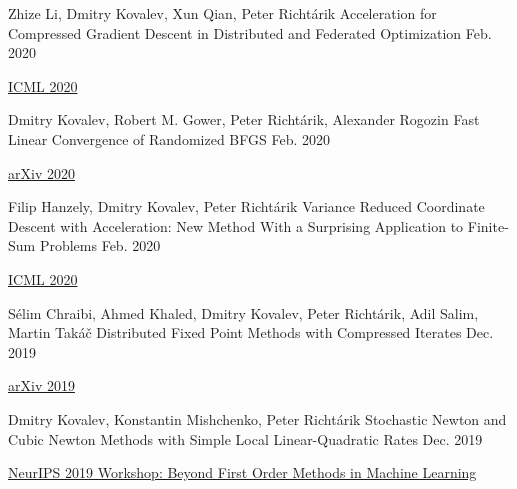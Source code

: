 \begin{cventries}
\cventry
{Zhize Li, Dmitry Kovalev, Xun Qian, Peter Richtárik} %
{Acceleration for Compressed Gradient Descent in Distributed and Federated Optimization} %
{} %
{Feb. 2020} %
{ %
	\begin{cvitems}
		\item {\href{https://proceedings.icml.cc/paper/2020/hash/18ad9899f3f21a5a1583584d5f11c0c0-Abstract.html}{ICML 2020}}		
	\end{cvitems}
}	
	
\cventry
{Dmitry Kovalev, Robert M. Gower, Peter Richtárik, Alexander Rogozin} %
{Fast Linear Convergence of Randomized BFGS} %
{} %
{Feb. 2020} %
{ %
	\begin{cvitems}
		\item {\href{https://arxiv.org/abs/2002.11337}{arXiv 2020}}		
	\end{cvitems}
}	
	
\cventry
{Filip Hanzely, Dmitry Kovalev, Peter Richtárik} %
{Variance Reduced Coordinate Descent with Acceleration: New Method With a Surprising Application to Finite-Sum Problems} %
{} %
{Feb. 2020} %
{ %
	\begin{cvitems}
		\item {\href{https://proceedings.icml.cc/paper/2020/hash/b571ecea16a9824023ee1af16897a582-Abstract.html}{ICML 2020}}		
	\end{cvitems}
}	
	
\cventry
{Sélim Chraibi, Ahmed Khaled, Dmitry Kovalev, Peter Richtárik, Adil Salim, Martin Takáč} %
{Distributed Fixed Point Methods with Compressed Iterates} %
{} %
{Dec. 2019} %
{ %
	\begin{cvitems}
		\item {\href{https://arxiv.org/abs/1912.09925}{arXiv 2019}}		
	\end{cvitems}
}	
	
\cventry
{Dmitry Kovalev, Konstantin Mishchenko, Peter Richtárik} %
{Stochastic Newton and Cubic Newton Methods with Simple Local Linear-Quadratic Rates} %
{} %
{Dec. 2019} %
{ %
	\begin{cvitems}
		\item {\href{https://sites.google.com/site/optneurips19/}{NeurIPS 2019 Workshop: Beyond First Order Methods in Machine Learning}}
	\end{cvitems}
}	


\end{cventries}
